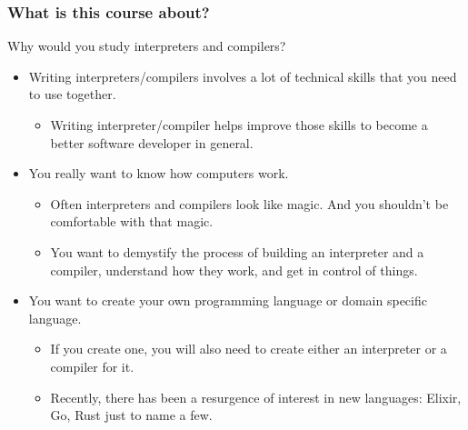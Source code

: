 \documentclass{beamer}
\begin{document}
\begin{frame}[fragile]
\frametitle{What is this course about?}

Why would you study interpreters and compilers? 
\pause
\begin{itemize}
\item Writing interpreters/compilers involves a lot of technical skills that you need to use together. 
\begin{itemize}
\item Writing interpreter/compiler helps improve those skills to become a better software developer in general. 
\end{itemize}
\pause

\item You really want to know how computers work. 
\begin{itemize}

\item Often interpreters and compilers look like magic. And you shouldn't be comfortable with that magic. 

\item You want to demystify the process of building an interpreter and a compiler, understand how they work, and get in control of things.
\end{itemize}
\pause

\item You want to create your own programming language or domain specific language. 
\begin{itemize}
\item If you create one, you will also need to create either an interpreter or a compiler for it. 
\item Recently, there has been a resurgence of interest in new  languages: Elixir, Go, Rust just to name a few.
\end{itemize}
\end{itemize}

\end{frame}
\end{document}
